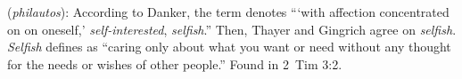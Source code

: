 \item[Selfishness,]

(\textit{philautos}):
According to Danker, the term denotes ```with affection concentrated on on oneself,' \emph{self-interested}, \emph{selfish}.'' Then, Thayer and Gingrich agree on \emph{selfish}. \emph{Selfish} defines as ``caring only about what you want or need without any thought for the needs or wishes of other people.''
Found in 2~Tim 3:2.
